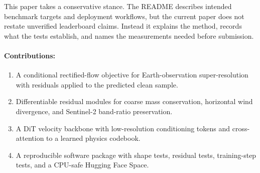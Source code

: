 \documentclass{article}
\begin{document}
This paper takes a conservative stance. The README describes intended benchmark targets and deployment workflows, but the current paper does not restate unverified leaderboard claims. Instead it explains the method, records what the tests establish, and names the measurements needed before submission.

\paragraph{Contributions:}
\begin{enumerate}
  \item A conditional rectified-flow objective for Earth-observation super-resolution with residuals applied to the predicted clean sample.
  \item Differentiable residual modules for coarse mass conservation, horizontal wind divergence, and Sentinel-2 band-ratio preservation.
  \item A DiT velocity backbone with low-resolution conditioning tokens and cross-attention to a learned physics codebook.
  \item A reproducible software package with shape tests, residual tests, training-step tests, and a CPU-safe Hugging Face Space.
\end{enumerate}
\end{document}
